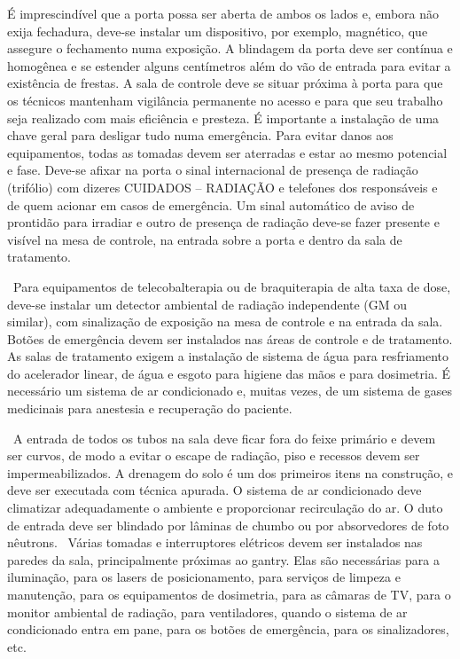 \documentclass[
	12pt,				%
    oneside,			%
	a4paper,			%
	english,			%
	french,				%
	spanish,			%
	brazil,				%
	]{abntex2}
\begin{document}
É imprescindível que a porta possa ser aberta de ambos os lados e, embora não exija fechadura, deve-se instalar um dispositivo, por exemplo, magnético, que assegure o fechamento numa exposição. A blindagem da porta deve ser contínua e homogênea e se estender alguns centímetros além do vão de entrada para evitar a existência de frestas. A sala de controle deve se situar próxima à porta para que os técnicos mantenham vigilância permanente no acesso e para que seu trabalho seja realizado com mais eficiência e presteza. É importante a instalação de uma chave geral para desligar tudo numa emergência. Para evitar danos aos equipamentos, todas as tomadas devem ser aterradas e estar ao mesmo potencial e fase. Deve-se afixar na porta o sinal internacional de presença de radiação (trifólio) com dizeres CUIDADOS – RADIAÇÃO e telefones dos responsáveis e de quem acionar em casos de emergência. Um sinal automático de aviso de prontidão para irradiar e outro de presença de radiação deve-se fazer presente e visível na mesa de controle, na entrada sobre a porta e dentro da sala de tratamento. 

 Para equipamentos de telecobalterapia ou de braquiterapia de alta taxa de dose, deve-se instalar um detector ambiental de radiação independente (GM ou similar), com sinalização de exposição na mesa de controle e na entrada da sala. Botões de emergência devem ser instalados nas áreas de controle e de tratamento. As salas de tratamento exigem a instalação de sistema de água para resfriamento do acelerador linear, de água e esgoto para higiene das mãos e para dosimetria. É necessário um sistema de ar condicionado e, muitas vezes, de um sistema de gases medicinais para anestesia e recuperação do paciente. 

 A entrada de todos os tubos na sala deve ficar fora do feixe primário e devem ser curvos, de modo a evitar o escape de radiação, piso e recessos devem ser impermeabilizados. A drenagem do solo é um dos primeiros itens na construção, e deve ser executada com técnica apurada. O sistema de ar condicionado deve climatizar adequadamente o ambiente e proporcionar recirculação do ar. O duto de entrada deve ser blindado por lâminas de chumbo ou por absorvedores de foto nêutrons.  Várias tomadas e interruptores elétricos devem ser instalados nas paredes da sala, principalmente próximas ao gantry. Elas são necessárias para a iluminação, para os lasers de posicionamento, para serviços de limpeza e manutenção, para os equipamentos de dosimetria, para as câmaras de TV, para o monitor ambiental de radiação, para ventiladores, quando o sistema de ar condicionado entra em pane, para os botões de emergência, para os sinalizadores, etc. 
\end{document}
